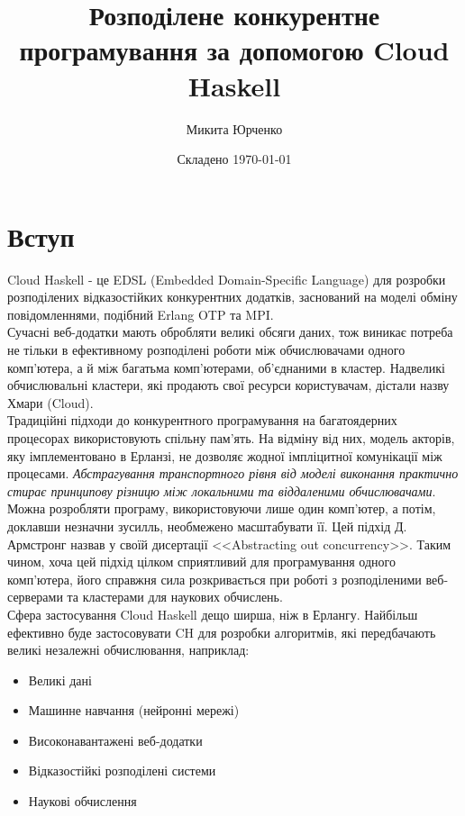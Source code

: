 \documentclass[12pt]{article}
\title{Розподілене конкурентне програмування 
    за допомогою Cloud Haskell}
\author{Микита Юрченко}
\date{Складено \today}
\begin{document}
\setlength{\epigraphwidth}{.55\textwidth}

\maketitle

\tableofcontents

\section{Вступ}

Cloud Haskell - це EDSL (Embedded Domain-Specific Language) для розробки розподілених відказостійких конкурентних додатків, заснований на моделі обміну повідомленнями, подібний Erlang OTP \cite{haskellInCloud}\cite{epsteinThesis} та MPI.\\ 

Сучасні веб-додатки мають обробляти великі обсяги даних, тож виникає потреба не тільки в ефективному розподілені роботи між обчислювачами одного комп'ютера, а й між багатьма комп'ютерами, об'єднаними в кластер. Надвеликі обчислювальні кластери, які продають свої ресурси користувачам, дістали назву Хмари (Cloud).\\

Традиційні підходи до конкурентного програмування на багатоядерних процесорах використовують спільну пам'ять. На відміну від них, модель акторів, яку імплементовано в Ерланзі, не дозволяє жодної імпліцитної комунікації між процесами. \textit{Абстрагування транспортного рівня від моделі виконання практично стирає принципову різницю між локальними та віддаленими обчислювачами}. Можна розробляти програму, використовуючи лише один комп'ютер, а потім, доклавши незначни зусилль, необмежено масштабувати її. Цей підхід Д. Армстронг назвав у своїй дисертації <<Abstracting out concurrency>>\cite{armstrongThesis}. Таким чином, хоча цей підхід цілком сприятливий для програмування одного комп'ютера, його справжня сила розкривається при роботі з розподіленими веб-серверами та кластерами для наукових обчислень.\\

Сфера застосування Cloud Haskell дещо ширша, ніж в Ерлангу. Найбільш ефективно буде застосовувати CH для розробки алгоритмів, які передбачають великі незалежні обчислювання, наприклад:\\

\begin{itemize}
\item Великі дані
\item Машинне навчання (нейронні мережі)
\item Високонавантажені веб-додатки
\item Відказостійкі розподілені системи
\item Наукові обчислення
\end{itemize}
\end{document}
